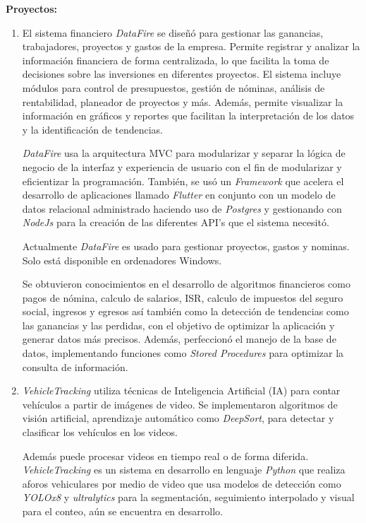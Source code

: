 \documentclass[protocolo.tex]{subfiles}
\begin{document}
\textbf{Proyectos:}
\begin{enumerate}
\item El sistema financiero \textit{DataFire} se diseñó para gestionar las ganancias,  
trabajadores,  proyectos  y  gastos  de  la  empresa.  
Permite  registrar  y  analizar  la  información  financiera  de  forma  centralizada,  lo  que  facilita  
la  toma  de  decisiones  sobre  las  inversiones  en  diferentes  proyectos.  
El  sistema  incluye  módulos  para  control  de  presupuestos,  gestión  de  nóminas,  análisis  de  rentabilidad,
planeador de proyectos y más.  Además,  permite  visualizar  la  información  en  gráficos  y  
reportes  que  facilitan  la  interpretación  de  los  datos  y  la  identificación  de  tendencias.\vspace{5mm} 

\textit{DataFire} usa la arquitectura MVC para modularizar y separar la lógica de negocio de la interfaz y experiencia de usuario con el fin de modularizar y eficientizar la programación. 
También, se usó un \textit{Framework} que acelera el desarrollo de aplicaciones llamado \textit{Flutter} en conjunto con un modelo de datos relacional administrado haciendo uso de \textit{Postgres} 
y gestionando con \textit{NodeJs} para la creación de las diferentes API’s que el sistema necesitó.\vspace{5mm} 

Actualmente \textit{DataFire} es usado para gestionar proyectos, gastos y nominas. Solo está disponible en ordenadores Windows.

Se obtuvieron conocimientos en el desarrollo de algoritmos financieros como pagos de nómina, calculo de salarios, ISR, calculo de impuestos del seguro social, ingresos y egresos así también como la detección de tendencias como las ganancias y las perdidas, con el objetivo de optimizar la aplicación y generar datos más precisos. Además,  perfeccionó el manejo de la base de datos, implementando funciones como \textit{Stored Procedures} para optimizar la consulta de información.

\item \textit{VehicleTracking} utiliza técnicas de Inteligencia Artificial (IA) para  contar  vehículos  a  partir  de  imágenes  de  video.  Se  implementaron  algoritmos  de visión  artificial,  aprendizaje  automático como \textit{DeepSort}, para  detectar  y  clasificar  los  vehículos  en  los  videos.  

Además  puede  procesar  videos  en  tiempo  real  o  de  forma  diferida.
\textit{VehicleTracking} es un sistema en desarrollo en lenguaje \textit{Python} que realiza aforos vehiculares por medio de video que usa modelos de detección como \textit{YOLOx8} y \textit{ultralytics} para la segmentación, seguimiento interpolado y visual para el conteo, aún se encuentra en desarrollo.\vspace{5mm} 



\end{enumerate}
\end{document}
